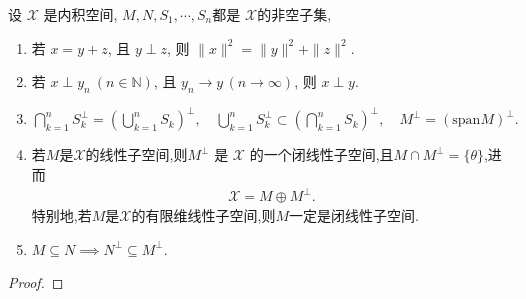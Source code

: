\documentclass[../../main.tex]{subfiles}%
\begin{document}
\begin{proposition}\label{proposition:正交的基本性质}
设 $\mathscr{X}$ 是内积空间, $M,N,S_1,\cdots,S_n$都是 $\mathscr{X}$的非空子集,
\begin{enumerate}[(1)]
\item\label{proposition:正交的基本性质-2} 若 $x=y+z$, 且 $y\perp z$, 则 $\|x\|^2=\|y\|^2+\|z\|^2$.

\item\label{proposition:正交的基本性质-3} 若 $x\perp y_n\ (n\in\mathbb{N})$, 且 $y_n\to y\,(n\to \infty)$, 则 $x\perp y$.

\item\label{proposition:正交的基本性质-4} $\bigcap_{k=1}^n{S_{k}^{\bot}}=\left( \bigcup_{k=1}^n{S_k} \right) ^{\bot},\quad \bigcup_{k=1}^n{S_{k}^{\bot}}\subset \left( \bigcap_{k=1}^n{S_k} \right) ^{\bot},\quad M^{\bot}=(\text{span}M)^{\bot}.$

\item\label{proposition:正交的基本性质-5} 若$M$是$\mathscr{X}$的线性子空间,则$M^\perp$ 是 $\mathscr{X}$ 的一个闭线性子空间,且$M\cap M^{\bot}=\{\theta\}$,进而
\begin{align*}
\mathscr{X}=M\oplus M^{\bot}.
\end{align*}
特别地,若$M$是$\mathscr{X}$的有限维线性子空间,则$M$一定是闭线性子空间.

\item\label{proposition:正交的基本性质-6} $M\subseteq N\implies N^\perp\subseteq M^\perp.$
\end{enumerate}
\end{proposition}
\begin{proof}
\end{proof}
\end{document}
